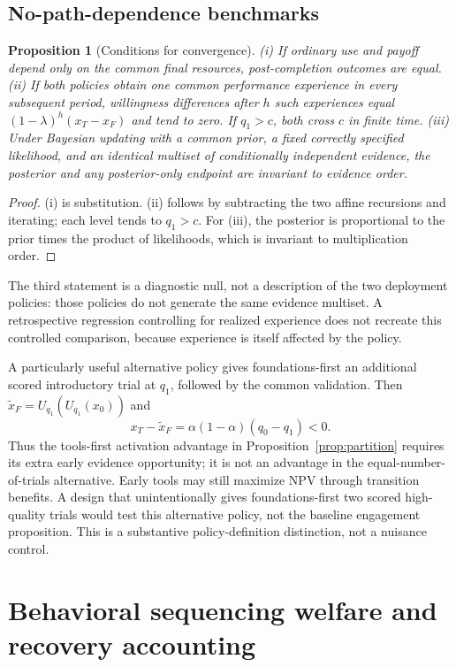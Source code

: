 \documentclass[11pt]{article}
\newtheorem{proposition}{Proposition}
\begin{document}
\subsection{No-path-dependence benchmarks}
\begin{proposition}[Conditions for convergence]\label{prop:null}
(i) If ordinary use and payoff depend only on the common final resources, post-completion outcomes are equal. (ii) If both policies obtain one common performance experience in every subsequent period, willingness differences after $h$ such experiences equal $(1-\lambda)^h(x_T-x_F)$ and tend to zero. If $q_1>c$, both cross $c$ in finite time. (iii) Under Bayesian updating with a common prior, a fixed correctly specified likelihood, and an identical multiset of conditionally independent evidence, the posterior and any posterior-only endpoint are invariant to evidence order.
\end{proposition}
\begin{proof}
(i) is substitution. (ii) follows by subtracting the two affine recursions and iterating; each level tends to $q_1>c$. For (iii), the posterior is proportional to the prior times the product of likelihoods, which is invariant to multiplication order.
\end{proof}
The third statement is a diagnostic null, not a description of the two deployment policies: those policies do not generate the same evidence multiset. A retrospective regression controlling for realized experience does not recreate this controlled comparison, because experience is itself affected by the policy.

A particularly useful alternative policy gives foundations-first an additional scored introductory trial at $q_1$, followed by the common validation. Then $\widetilde x_F=U_{q_1}(U_{q_1}(x_0))$ and
\begin{equation}
 x_T-\widetilde x_F=\alpha(1-\alpha)(q_0-q_1)<0.
\end{equation}
Thus the tools-first activation advantage in Proposition~\ref{prop:partition} requires its extra early evidence opportunity; it is not an advantage in the equal-number-of-trials alternative. Early tools may still maximize NPV through transition benefits. A design that unintentionally gives foundations-first two scored high-quality trials would test this alternative policy, not the baseline engagement proposition. This is a substantive policy-definition distinction, not a nuisance control.

\section{Behavioral sequencing welfare and recovery accounting}
\end{document}
